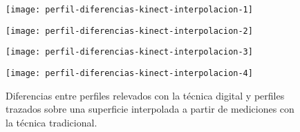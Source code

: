 \begin{figure}[ht]
\centering
\begin{minipage}[h]{.45\textwidth}
\begin{center}
\texttt{[image: perfil-diferencias-kinect-interpolacion-1]}
\end{center}
\end{minipage}
\hfill
\begin{minipage}[h]{.45\textwidth}
\begin{center}
\texttt{[image: perfil-diferencias-kinect-interpolacion-2]}
\end{center}
\end{minipage}
\hfill
\begin{minipage}[h]{.45\textwidth}
\begin{center}
\texttt{[image: perfil-diferencias-kinect-interpolacion-3]}
\end{center}
\end{minipage}
\hfill
\begin{minipage}[h]{.45\textwidth}
\begin{center}
\texttt{[image: perfil-diferencias-kinect-interpolacion-4]}
\end{center}
\end{minipage}
\hfill
\caption[Diferencias entre perfiles con Kinect y perfiles extraídos desde superficie interpolada]
{Diferencias entre perfiles relevados con la técnica digital y perfiles trazados sobre una superficie interpolada a partir de mediciones con la técnica tradicional.}
\label{fig:perfiles-diferencia-kinect-interpolacion}
\end{figure}

